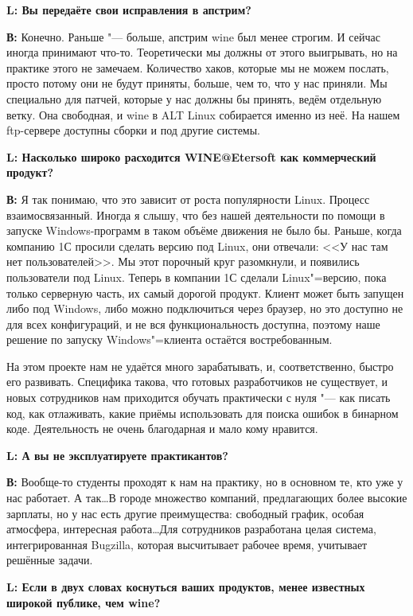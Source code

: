 \documentclass[10pt, a5paper]{article}
\begin{document}
{\noindent \bf L: Вы передаёте свои  исправления в апстрим?}

{\noindent \bf В:} Конечно. Раньше "--- больше, апстрим wine был менее строгим. И сейчас иногда принимают что-то. Теоретически мы должны от этого выигрывать, но на практике этого не замечаем. Количество хаков, которые мы не можем послать, просто потому они не будут приняты, больше, чем то, что у нас приняли. Мы специально для патчей, которые у нас должны бы принять, ведём отдельную ветку. Она свободная, и wine в ALT Linux собирается именно из неё. На нашем ftp-сервере доступны сборки и под другие системы.

{\noindent \bf L: Насколько широко расходится  WINE@Etersoft как коммерческий продукт?}

{\noindent \bf В:} Я так понимаю, что это зависит от роста популярности Linux. Процесс взаимосвязанный. Иногда я слышу, что без нашей деятельности по помощи в запуске Windows-программ в таком объёме движения не было бы. Раньше, когда компанию 1С просили сделать версию под Linux, они отвечали: <<У нас там нет пользователей>>. Мы этот порочный круг разомкнули, и появились пользователи под Linux. Теперь в компании 1С сделали Linux"=версию, пока только серверную часть, их самый дорогой продукт. Клиент может быть запущен либо под Windows, либо можно подключиться через браузер, но это доступно не для всех конфигураций, и не вся функциональность доступна, поэтому наше решение по запуску Windows"=клиента остаётся востребованным.

На этом проекте нам не удаётся много зарабатывать, и, соответственно, быстро его развивать. Специфика такова, что готовых разработчиков не существует, и новых сотрудников нам приходится обучать практически с нуля "--- как писать код, как отлаживать, какие приёмы использовать для поиска ошибок в бинарном коде. Деятельность не очень благодарная и мало кому нравится.

{\noindent \bf L: А вы не эксплуатируете практикантов?}

{\noindent \bf В:} Вообще-то студенты проходят к нам на практику, но в основном те, кто уже у нас работает. А так\ldots В городе множество компаний, предлагающих более высокие зарплаты, но у нас есть другие преимущества:  свободный график, особая атмосфера, интересная работа\ldots Для сотрудников разработана целая система,  интегрированная  Bugzilla, которая высчитывает рабочее время, учитывает решённые задачи.

{\noindent \bf L: Если в двух словах коснуться ваших продуктов, менее известных широкой публике, чем wine?}
\end{document}
